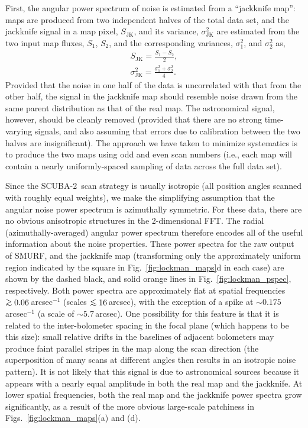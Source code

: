 \documentclass[useAMS,usenatbib,nofootinbib]{mn2e}
\newcommand{\scuba}{SCUBA-2}
\def\lsim{\mathrel{\lower2.5pt\vbox{\lineskip=0pt\baselineskip=0pt
          \hbox{$<$}\hbox{$\sim$}}}}
\def\gsim{\mathrel{\lower2.5pt\vbox{\lineskip=0pt\baselineskip=0pt
          \hbox{$>$}\hbox{$\sim$}}}}
\begin{document}
First, the angular power spectrum of noise is estimated from a
``jackknife map'': maps are produced from two independent halves of
the total data set, and the jackknife signal in a map pixel,
$S_\mathrm{JK}$, and its variance, $\sigma^2_\mathrm{JK}$ are
estimated from the two input map fluxes, $S_1$, $S_2$, and the
corresponding variances, $\sigma^2_1$, and $\sigma^2_2$ as,
%
\begin{eqnarray}
S_\mathrm{JK} = \frac{S_1 - S_2}{2}, \\
\sigma^2_\mathrm{JK} = \frac{\sigma^2_1 + \sigma^2_2}{4}.
\end{eqnarray}
%
Provided that the noise in one half of the data is uncorrelated with
that from the other half, the signal in the jackknife map should
resemble noise drawn from the same parent distribution as that of the
real map. The astronomical signal, however, should be cleanly removed
(provided that there are no strong time-varying signals, and also
assuming that errors due to calibration between the two halves are
insignificant). The approach we have taken to minimize systematics is
to produce the two maps using odd and even scan numbers (i.e., each
map will contain a nearly uniformly-spaced sampling of data across the
full data set).

Since the \scuba\ scan strategy is usually isotropic (all position
angles scanned with roughly equal weights), we make the simplifying
assumption that the angular noise power spectrum is azimuthally
symmetric. For these data, there are no obvious anisotropic structures
in the 2-dimensional FFT. The radial (azimuthally-averaged) angular
power spectrum therefore encodes all of the useful information about
the noise properties. These power spectra for the raw output of SMURF,
and the jackknife map (transforming only the approximately uniform
region indicated by the square in Fig.~\ref{fig:lockman_maps}d in each
case) are shown by the dashed black, and solid orange lines in
Fig.~\ref{fig:lockman_pspec}, respectively. Both power spectra are
approximately flat at spatial frequencies $\gsim 0.06$\,arcsec$^{-1}$
(scales $\lsim16$\,arcsec), with the exception of a spike at
$\sim0.175$\,arcsec$^{-1}$ (a scale of $\sim5.7$\,arcsec). One
possibility for this feature is that it is related to the
inter-bolometer spacing in the focal plane (which happens to be this
size): small relative drifts in the baselines of adjacent bolometers
may produce faint parallel stripes in the map along the scan direction
(the superposition of many scans at different angles then results in
an isotropic noise pattern). It is not likely that this signal is due
to astronomical sources because it appears with a nearly equal
amplitude in both the real map and the jackknife.  At lower spatial
frequencies, both the real map and the jackknife power spectra grow
significantly, as a result of the more obvious large-scale patchiness
in Figs.~\ref{fig:lockman_maps}(a) and (d).
\end{document}
